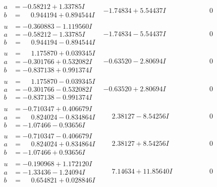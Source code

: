 \documentclass[1p]{elsarticle_modified}
\theoremstyle{definition}
\begin{document}
$$\begin{array}{c|c|c}
\begin{aligned}
a &= -0.58212 + 1.33785 I \\
b &= \phantom{-}0.944194 + 0.894544 I\end{aligned}
 & -1.74834 + 5.54437 I & \phantom{-0.000000 } 0 \\ \hline\begin{aligned}
u &= -0.360883 - 1.119560 I \\
a &= -0.58212 - 1.33785 I \\
b &= \phantom{-}0.944194 - 0.894544 I\end{aligned}
 & -1.74834 - 5.54437 I & \phantom{-0.000000 } 0 \\ \hline\begin{aligned}
u &= \phantom{-}1.175870 + 0.039345 I \\
a &= -0.301766 + 0.532082 I \\
b &= -0.837138 + 0.991374 I\end{aligned}
 & -0.63520 - 2.80694 I & \phantom{-0.000000 } 0 \\ \hline\begin{aligned}
u &= \phantom{-}1.175870 - 0.039345 I \\
a &= -0.301766 - 0.532082 I \\
b &= -0.837138 - 0.991374 I\end{aligned}
 & -0.63520 + 2.80694 I & \phantom{-0.000000 } 0 \\ \hline\begin{aligned}
u &= -0.710347 + 0.406679 I \\
a &= \phantom{-}0.824024 - 0.834864 I \\
b &= -1.07466 - 0.93656 I\end{aligned}
 & \phantom{-}2.38127 - 8.54256 I & \phantom{-0.000000 } 0 \\ \hline\begin{aligned}
u &= -0.710347 - 0.406679 I \\
a &= \phantom{-}0.824024 + 0.834864 I \\
b &= -1.07466 + 0.93656 I\end{aligned}
 & \phantom{-}2.38127 + 8.54256 I & \phantom{-0.000000 } 0 \\ \hline\begin{aligned}
u &= -0.190968 + 1.172120 I \\
a &= -1.33436 - 1.24094 I \\
b &= \phantom{-}0.654821 + 0.028846 I\end{aligned}
 & \phantom{-}7.14634 + 11.85640 I & \phantom{-0.000000 } 0 \\ \hline\begin{aligned}

\end{aligned}
\end{array}$$
\end{document}
